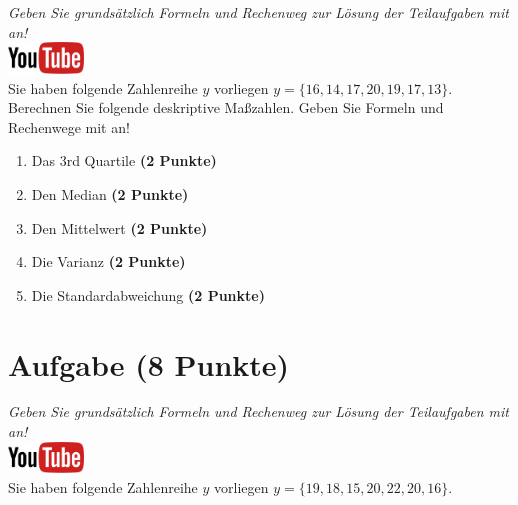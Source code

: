 \documentclass[a4paper, 10pt]{scrartcl}\usepackage[]{graphicx}\usepackage[]{xcolor}
\begin{document}
\textit{Geben Sie grunds{\"a}tzlich Formeln und Rechenweg zur L{\"o}sung der
  Teilaufgaben mit an!} \\[1Ex]

\hfill\href{https://youtu.be/sBlSc_eJbnw}{\includegraphics[width =
  2cm]{img/youtube}}\\[1Ex]


Sie haben folgende Zahlenreihe $y$ vorliegen
$y = \{16, 14, 17, 20, 19, 17, 13\}$. Berechnen Sie folgende
deskriptive Ma{\ss}zahlen. Geben Sie Formeln und Rechenwege mit an!



\begin{enumerate}
\item Das 3rd Quartile \textbf{(2 Punkte)}
\item Den Median \textbf{(2 Punkte)}
\item Den Mittelwert \textbf{(2 Punkte)}
\item Die Varianz \textbf{(2 Punkte)}
\item Die Standardabweichung \textbf{(2 Punkte)}
\end{enumerate}
 
\clearpage

\section{Aufgabe \hfill (8 Punkte)}

\textit{Geben Sie grunds{\"a}tzlich Formeln und Rechenweg zur L{\"o}sung der
  Teilaufgaben mit an!} \\[1Ex]

\hfill\href{https://youtu.be/oMdtYbDInYE}{\includegraphics[width =
  2cm]{img/youtube}}\\[1Ex]

Sie haben folgende Zahlenreihe $y$ vorliegen
$y = \{19, 18, 15, 20, 22, 20, 16\}$.
\end{document}
